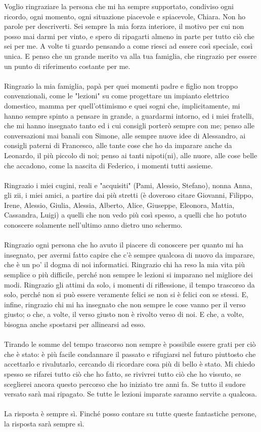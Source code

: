 Voglio ringraziare la persona che mi ha sempre supportato, condiviso ogni ricordo, ogni momento, ogni situazione piacevole e spiacevole, Chiara. Non ho parole per descriverti. Sei sempre la mia forza interiore, il motivo per cui non posso mai darmi per vinto, e spero di ripagarti almeno in parte per tutto ciò che sei per me. A volte ti guardo pensando a come riesci ad essere così speciale, così unica. E penso che un grande merito va alla tua famiglia, che ringrazio per essere un punto di riferimento costante per me.\\ \\ 
Ringrazio la mia famiglia, papà per quei momenti padre e figlio non troppo convenzionali, come le "lezioni" su come progettare un impianto elettrico domestico, mamma per quell'ottimismo e quei sogni che, implicitamente, mi hanno sempre spinto a pensare in grande, a guardarmi intorno, ed i miei fratelli, che mi hanno insegnato tanto ed i cui consigli porterò sempre con me; penso alle conversazioni mai banali con Simone, alle sempre nuove idee di Alessandro, ai consigli paterni di Francesco, alle tante cose che ho da imparare anche da Leonardo, il più piccolo di noi; penso ai tanti nipoti(ni), alle nuore, alle cose belle che accadono, come la nascita di Federico, i momenti tutti assieme. \\ \\ 
Ringrazio i miei cugini, reali e "acquisiti" (Pami, Alessio, Stefano), nonna Anna, gli zii, i miei amici, a partire dai più stretti (è doveroso citare Giovanni, Filippo, Irene, Alessio, Giulia, Alessia, Alberto, Alice, Giuseppe, Eleonora, Mattia, Cassandra, Luigi) a quelli che non vedo più così spesso, a quelli che ho potuto conoscere solamente nell'ultimo anno dietro uno schermo. \\ \\ 
Ringrazio ogni persona che ho avuto il piacere di conoscere per quanto mi ha insegnato, per avermi fatto capire che c'è sempre qualcosa di nuovo da imparare, che è un po' il dogma di noi informatici. Ringrazio chi ha reso la mia vita più semplice o più difficile, perché non sempre le lezioni si imparano nel migliore dei modi. Ringrazio gli attimi da solo, i momenti di riflessione, il tempo trascorso da solo, perché non si può essere veramente felici se non si è felici con se stessi. E, infine, ringrazio chi mi ha insegnato che non sempre le cose vanno per il verso giusto; o che, a volte, il verso giusto non è rivolto verso di noi. E che, a volte, bisogna anche spostarsi per allinearsi ad esso.\\ \\
Tirando le somme del tempo trascorso non sempre è possibile essere grati per ciò che è stato: è più facile condannare il passato e rifugiarsi nel futuro piuttosto che accettarlo e rivalutarlo, cercando di ricordare cosa più di bello è stato.
Mi chiedo spesso se rifarei tutto ciò che ho fatto, se rivivrei tutto ciò che ho vissuto, se sceglierei ancora questo percorso che ho iniziato tre anni fa. Se tutto il sudore versato sarà mai ripagato. Se tutte le lezioni imparate saranno servite a qualcosa. \\ \\ La risposta è sempre sì. Finché posso contare su tutte queste fantastiche persone, la risposta sarà sempre sì.
